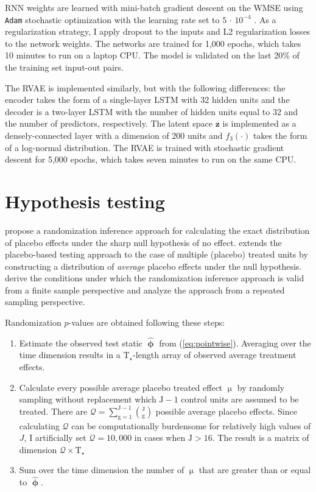 RNN weights are learned with mini-batch gradient descent on the WMSE using \texttt{Adam} stochastic optimization with the learning rate set to $5\,\cdot\,10^{-4}$ \citep{kingma2014adam}. As a regularization strategy, I apply dropout to the inputs and L2 regularization losses to the network weights. The networks are trained for 1,000 epochs, which takes 10 minutes to run on a laptop CPU. The model is validated on the last 20\% of the training set input-out pairs.  

The RVAE is implemented similarly, but with the following differences: the encoder takes the form of a single-layer LSTM with 32 hidden units and the decoder is a two-layer LSTM with the number of hidden units equal to 32 and the number of predictors, respectively. The latent space $\boldsymbol{z}$ is implemented as a densely-connected layer with a dimension of 200 units and $f_3(\cdot)$ takes the form of a log-normal distribution. The RVAE is trained with stochastic gradient descent for 5,000 epochs, which takes seven minutes to run on the same CPU.

\clearpage
\section{Hypothesis testing} \label{eval}

\citet{abadie2010synthetic} propose a randomization inference approach for calculating the exact distribution of placebo effects under the sharp null hypothesis of no effect. \citet{cavallo2013catastrophic} extends the placebo-based testing approach to the case of multiple (placebo) treated units by constructing a distribution of \emph{average} placebo effects under the null hypothesis. \citet{firpo2018synthetic} derive the conditions under which the randomization inference approach is valid from a finite sample perspective and \citet{hahn2017synthetic} analyze the approach from a repeated sampling perspective.

Randomization $p$-values are obtained following these steps:

\begin{enumerate} 
	\item Estimate the observed test static $\boldsymbol{\hat{\upphi}}$ from (\ref{eq:pointwise}). Averaging over the time dimension results in a $\text{T}_\star$-length array of observed average treatment effects. 
	\item Calculate every possible average placebo treated effect $\upmu$ by randomly sampling without replacement which $\text{J}-1$ control units are assumed to be treated. There are $\mathcal{Q} = \sum\limits_{\text{g}=1}^{\text{J}-1} {\text{J} \choose \text{g}}$ possible average placebo effects. Since calculating $\mathcal{Q}$ can be computationally burdensome for relatively high values of $J$, I artificially set $\mathcal{Q} = 10,000$ in cases when $\text{J} > 16$. The result is a matrix of dimension $\mathcal{Q} \times \text{T}_\star$
	\item Sum over the time dimension the number of $\upmu$ that are greater than or equal to $\boldsymbol{\hat{\upphi}}$.  \label{counts}
\end{enumerate}

